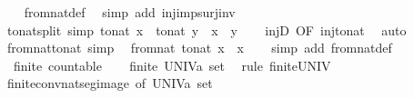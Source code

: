 \begin{isabellebody}
%
\isadelimproof
\ \ %
\endisadelimproof
%
\isatagproof
{}\isamarkupfalse%
\ from{\isacharunderscore}nat{\isacharunderscore}def\ \isamarkupfalse%
\ {\isacharparenleft}simp\ add{\isacharcolon}\ inj{\isacharunderscore}imp{\isacharunderscore}surj{\isacharunderscore}inv{\isacharparenright}%
\endisatagproof
{\isafoldproof}%
%
\isadelimproof
\isanewline
%
\endisadelimproof
\isanewline
{}\isamarkupfalse%
\ to{\isacharunderscore}nat{\isacharunderscore}split\ {\isacharbrackleft}simp{\isacharbrackright}{\isacharcolon}\ {\isachardoublequoteopen}to{\isacharunderscore}nat\ x\ {\isacharequal}\ to{\isacharunderscore}nat\ y\ {\isasymlongleftrightarrow}\ x\ {\isacharequal}\ y{\isachardoublequoteclose}\isanewline
%
\isadelimproof
\ \ %
\endisadelimproof
%
\isatagproof
{}\isamarkupfalse%
\ injD\ {\isacharbrackleft}OF\ inj{\isacharunderscore}to{\isacharunderscore}nat{\isacharbrackright}\ \isamarkupfalse%
\ auto%
\endisatagproof
{\isafoldproof}%
%
\isadelimproof
\isanewline
%
\endisadelimproof
\isanewline
{}\isamarkupfalse%
\ from{\isacharunderscore}nat{\isacharunderscore}to{\isacharunderscore}nat\ {\isacharbrackleft}simp{\isacharbrackright}{\isacharcolon}\isanewline
\ \ {\isachardoublequoteopen}from{\isacharunderscore}nat\ {\isacharparenleft}to{\isacharunderscore}nat\ x{\isacharparenright}\ {\isacharequal}\ x{\isachardoublequoteclose}\isanewline
%
\isadelimproof
\ \ %
\endisadelimproof
%
\isatagproof
{}\isamarkupfalse%
\ {\isacharparenleft}simp\ add{\isacharcolon}\ from{\isacharunderscore}nat{\isacharunderscore}def{\isacharparenright}%
\endisatagproof
{\isafoldproof}%
%
\isadelimproof
%
\endisadelimproof
%
\isadelimdocument
%
\endisadelimdocument
%
\isatagdocument
%
\isamarkuptrue%
%
\endisatagdocument
{\isafolddocument}%
%
\isadelimdocument
%
\endisadelimdocument
{}\isamarkupfalse%
\ {\isacharparenleft}\ finite{\isacharparenright}\ countable\isanewline
%
\isadelimproof
%
\endisadelimproof
%
\isatagproof
{}\isamarkupfalse%
\isanewline
\ \ \isamarkupfalse%
\ {\isachardoublequoteopen}finite\ {\isacharparenleft}UNIV{\isacharcolon}{\isacharcolon}{\isacharprime}a\ set{\isacharparenright}{\isachardoublequoteclose}\ \isamarkupfalse%
\ {\isacharparenleft}rule\ finite{\isacharunderscore}UNIV{\isacharparenright}\isanewline
\ \ \isamarkupfalse%
\ finite{\isacharunderscore}conv{\isacharunderscore}nat{\isacharunderscore}seg{\isacharunderscore}image\ {\isacharbrackleft}of\ {\isachardoublequoteopen}UNIV{\isacharcolon}{\isacharcolon}{\isacharprime}a\ set{\isachardoublequoteclose}{\isacharbrackright}\isanewline

\end{isabellebody}
